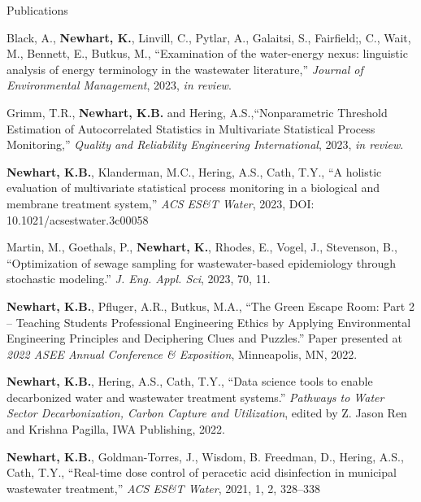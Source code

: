 \documentclass{resume} %
\begin{document}
\begin{rSection}{Publications}
\begin{etaremune}

	\item Black, A.,  \textbf{Newhart, K.},  Linvill, C.,  Pytlar, A., Galaitsi, S.,  Fairfield;, C.,  Wait, M.,  Bennett, E.,  Butkus, M., ``Examination of the water-energy nexus: linguistic analysis of energy terminology in the wastewater literature,'' \emph{Journal of Environmental Management}, 2023, \emph{in review}.

	\item Grimm, T.R., \textbf{Newhart, K.B.} and Hering, A.S.,``Nonparametric Threshold Estimation of Autocorrelated Statistics in Multivariate Statistical Process Monitoring,'' \emph{Quality and Reliability Engineering International}, 2023, \emph{in review}.

	\item \textbf{Newhart, K.B.}, Klanderman, M.C., Hering, A.S., Cath, T.Y., ``A holistic evaluation of multivariate statistical process monitoring in a biological and membrane treatment system,'' \emph{ACS ES\&T Water}, 2023, DOI: 10.1021/acsestwater.3c00058

	\item Martin, M., Goethals, P., \textbf{Newhart, K.}, Rhodes, E., Vogel, J., Stevenson, B., ``Optimization of sewage sampling for wastewater-based epidemiology through stochastic modeling.'' \emph{J. Eng. Appl. Sci}, 2023, 70, 11.

	\item\textbf{Newhart, K.B.}, Pfluger, A.R., Butkus, M.A., ``The Green Escape Room: Part 2 – Teaching Students Professional Engineering Ethics by Applying Environmental Engineering Principles and Deciphering Clues and Puzzles.'' Paper presented at \emph{2022 ASEE Annual Conference \& Exposition}, Minneapolis, MN, 2022.

	\item \textbf{Newhart, K.B.}, Hering, A.S., Cath, T.Y., ``Data science tools to enable decarbonized water and wastewater treatment systems.'' \emph{Pathways to Water Sector Decarbonization, Carbon Capture and Utilization}, edited by Z. Jason Ren and Krishna Pagilla, IWA Publishing, 2022.

	\item \textbf{Newhart, K.B.}, Goldman-Torres, J., Wisdom, B. Freedman, D., Hering, A.S., Cath, T.Y., ``Real-time dose control of peracetic acid disinfection in municipal wastewater treatment,'' \emph{ACS ES\&T Water}, 2021, 1, 2, 328–338


\end{etaremune}
\end{rSection}
\end{document}
